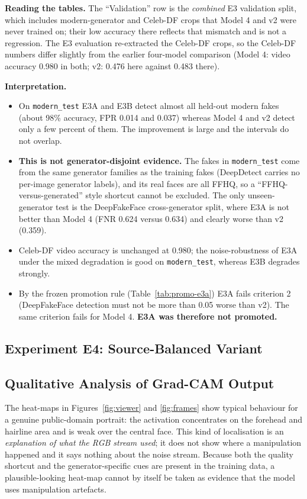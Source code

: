 \textbf{Reading the tables.} The ``Validation'' row is the \emph{combined} E3 validation split, which includes modern-generator and Celeb-DF crops
that Model 4 and v2 were never trained on; their low accuracy there reflects that mismatch and is not a regression. The E3 evaluation re-extracted the Celeb-DF crops, so
the Celeb-DF numbers differ slightly from the earlier four-model comparison (Model 4: video accuracy 0.980 in both; v2: 0.476 here against 0.483 there).



\textbf{Interpretation.}
\begin{itemize}
\item On \texttt{modern\_test} E3A and E3B detect almost all held-out modern fakes (about 98\% accuracy, FPR 0.014 and 0.037) whereas Model 4 and v2 detect
only a few percent of them. The improvement is large and the intervals do not overlap.
\item \textbf{This is not generator-disjoint evidence.} The fakes in \texttt{modern\_test} come from the same generator families as the training fakes
(DeepDetect carries no per-image generator labels), and its real faces are all FFHQ, so a ``FFHQ-versus-generated'' style shortcut cannot be excluded.
The only unseen-generator test is the DeepFakeFace cross-generator split, where E3A is not better than Model 4 (FNR 0.624 versus 0.634) and clearly worse than v2 (0.359).
\item Celeb-DF video accuracy is unchanged at 0.980; the noise-robustness of E3A under the mixed degradation is good on \texttt{modern\_test}, whereas E3B degrades strongly.
\item By the frozen promotion rule (Table~\ref{tab:promo-e3a}) E3A fails criterion 2 (DeepFakeFace detection must not be more than 0.05 worse than v2). The same criterion fails for Model 4. \textbf{E3A was therefore not promoted.}
\end{itemize}

\subsection{Experiment E4: Source-Balanced Variant}
\label{sec:e4}


\subsection{Qualitative Analysis of Grad-CAM Output}
The heat-maps in Figures~\ref{fig:viewer} and \ref{fig:frames} show typical behaviour for a genuine public-domain portrait: the activation concentrates on
the forehead and hairline area and is weak over the central face. This kind of localisation is an \emph{explanation of what the RGB stream used}; it does not show where a
manipulation happened and it says nothing about the noise stream. Because both the quality shortcut and the generator-specific cues are present in the training
data, a plausible-looking heat-map cannot by itself be taken as evidence that the model uses manipulation artefacts.

